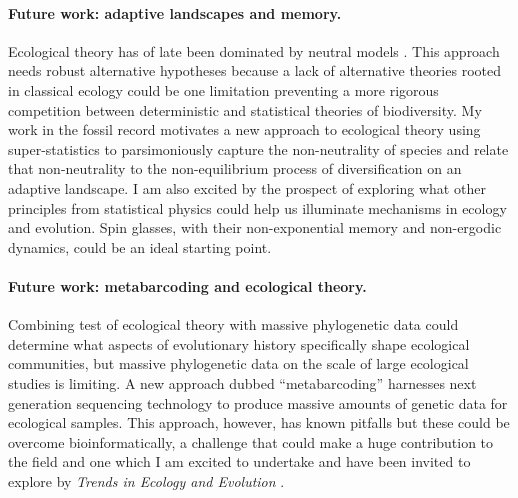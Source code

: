 \paragraph{Future work: adaptive landscapes and memory.}
Ecological theory has of late been dominated by neutral models
\citep[e.g.][]{rominger2009, rominger2015GEB}. This approach needs
robust alternative hypotheses because a lack of alternative theories
rooted in classical ecology could be one limitation preventing a more
rigorous competition between deterministic and statistical theories of
biodiversity. My work in the fossil record motivates a new approach to
ecological theory using super-statistics to parsimoniously capture the
non-neutrality of species and relate that non-neutrality to the
non-equilibrium process of diversification on an adaptive landscape. I
am also excited by the prospect of exploring what other principles
from statistical physics could help us illuminate mechanisms in
ecology and evolution. Spin glasses, with their non-exponential memory
and non-ergodic dynamics, could be an ideal starting point.

\paragraph{Future work: metabarcoding and ecological theory.}
Combining test of ecological theory with massive phylogenetic data
could determine what aspects of evolutionary history specifically
shape ecological communities, but massive phylogenetic data on the
scale of large ecological studies is limiting.  A new approach
dubbed ``metabarcoding'' \citep{taberlet2012} harnesses next
generation sequencing technology to produce massive amounts of genetic
data for ecological samples. This approach, however, has known
pitfalls but these could be overcome bioinformatically, a challenge
that could make a huge contribution to the field and one which I am
excited to undertake and have been invited to explore by {\it Trends
  in Ecology and Evolution} \citep{romTREE}.